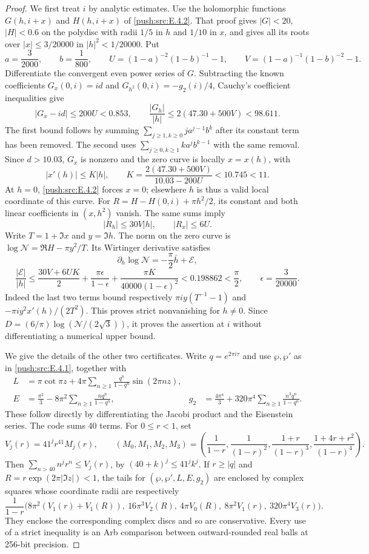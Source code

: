 \begin{proof}
We first treat $i$ by analytic estimates. Use the holomorphic
functions $G(h,i+x)$ and $H(h,i+x)$ of \ref{push:src:E.4.2}. That proof gives
$|G|<20$, $|H|<0.6$ on the polydisc with radii $1/5$ in $h$ and
$1/10$ in $x$, and gives all its roots over $|x|\leq3/20000$ in
$|h|^2<1/20000$. Put
\[
 a=\frac3{2000},\qquad b=\frac1{800},\qquad
 U=(1-a)^{-2}(1-b)^{-1}-1,\qquad
 V=(1-a)^{-1}(1-b)^{-2}-1.
\]
Differentiate the convergent even power series of $G$. Subtracting
the known coefficients $G_x(0,i)=id$ and
$G_{h^2}(0,i)=-g_2(i)/4$, Cauchy's coefficient inequalities give
\[
 |G_x-id|\leq200U<0.853,\qquad
 \frac{|G_h|}{|h|}\leq2(47.30+500V)<98.611.
\]
The first bound follows by summing
$\sum_{j\geq1,k\geq0}j a^{j-1}b^k$ after its constant term
has been removed. The second uses
$\sum_{j\geq0,k\geq1}k a^j b^{k-1}$ with the same removal.
Since $d>10.03$, $G_x$ is nonzero and the zero curve is locally
$x=x(h)$, with
\[
 |x'(h)|\leq K|h|,\qquad
 K=\frac{2(47.30+500V)}{10.03-200U}<10.745<11.
\]
At $h=0$, \ref{push:src:E.4.2} forces $x=0$; elsewhere $h$ is thus a valid local
coordinate of this curve. For
$R=H-H(0,i)+\pi h^2/2$, its constant and both linear coefficients
in $(x,h^2)$ vanish. The same sums imply
\[
 |R_h|\leq30V|h|,\qquad |R_x|\leq6U.
\]
Write $T=1+\Im x$ and $y=\Im h$. The norm on the zero curve is
$\log\mathcal N=\Re H-\pi y^2/T$. Its Wirtinger derivative satisfies
\[
 \partial_h\log\mathcal N
 =-\frac\pi2\bar h+\mathcal E,
\]
\[
 \frac{|\mathcal E|}{|h|}
 \leq\frac{30V+6UK}{2}
 +\frac{\pi\epsilon}{1-\epsilon}
 +\frac{\pi K}{40000(1-\epsilon)^2}
 <0.198862<\frac\pi2,\qquad \epsilon=\frac3{20000}.
\]
Indeed the last two terms bound respectively
$\pi i y(T^{-1}-1)$ and
$-\pi i y^2x'(h)/(2T^2)$. This proves strict nonvanishing for
$h\ne0$. Since $D=(6/\pi)\log(\mathcal N/(2\sqrt3))$, it proves
the assertion at $i$ without differentiating a numerical upper bound.

We give the details of the other two certificates. Write $q=e^{2\pi
i\tau}$ and use $\wp,\wp'$ as in \ref{push:src:E.4.1}, together with
\[
\begin{aligned}
 L&=\pi\cot\pi z+
       4\pi\sum_{n\geq1}\frac{q^n}{1-q^n}\sin(2\pi nz),\\
 E&=\frac{\pi^2}{3}-8\pi^2\sum_{n\geq1}\frac{nq^n}{1-q^n},&
 g_2&=\frac{4\pi^4}{3}
       +320\pi^4\sum_{n\geq1}\frac{n^3q^n}{1-q^n}.
\end{aligned}
\]
These follow directly by differentiating the Jacobi product and the
Eisenstein series. The code sums 40 terms. For $0\leq r<1$, set
\[
 V_j(r)=41^j r^{41}M_j(r),\qquad
 (M_0,M_1,M_2,M_3)=
 \left(\frac1{1-r},\frac1{(1-r)^2},
 \frac{1+r}{(1-r)^3},\frac{1+4r+r^2}{(1-r)^4}\right).
\]
Then $\sum_{n>40}n^j r^n\leq V_j(r)$, by
$(40+k)^j\leq41^jk^j$. If $r\geq|q|$ and
$R=r\exp(2\pi|\Im z|)<1$, the tails for
$(\wp,\wp',L,E,g_2)$ are enclosed by complex squares whose
coordinate radii are respectively
\[
 \frac1{1-r}\bigl(
 8\pi^2(V_1(r)+V_1(R)),\ 16\pi^3V_2(R),\
 4\pi V_0(R),\ 8\pi^2V_1(r),\ 320\pi^4V_3(r)\bigr).
\]
They enclose the corresponding complex discs and so are conservative.
Every use of a strict inequality is an Arb comparison between
outward-rounded real balls at 256-bit precision.


\end{proof}

